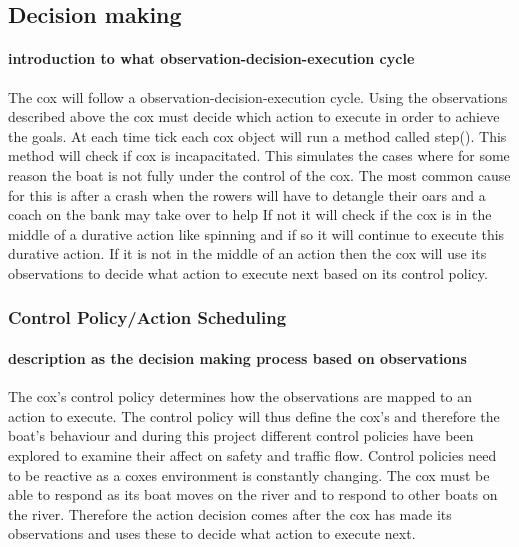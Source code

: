       \subsection{Decision making}
      \paragraph{introduction to what observation-decision-execution cycle}
      The cox will follow a observation-decision-execution cycle. Using the observations described above the cox must decide which action to execute in order to achieve the goals. At each time tick each cox object will run a method called step(). This method will check if cox is incapacitated. This simulates the cases where for some reason the boat is not fully under the control of the cox. The most common cause for this is after a crash when the rowers will have to detangle their oars and a coach on the bank may take over to help If not it will check if the cox is in the middle of a durative action like spinning and if so it will continue to execute this durative action. If it is not in the middle of an action then the cox will use its observations to decide what action to execute next based on its control policy.
      
      \subsubsection{Control Policy/Action Scheduling}
      \paragraph{description as the decision making process based on observations}
      The cox's control policy determines how the observations are mapped to an action to execute. The control policy will thus define the cox's and therefore the boat's behaviour and during this project different control policies have been explored to examine their affect on safety and traffic flow. Control policies need to be reactive as a coxes environment is constantly changing. The cox must be able to respond as its boat moves on the river and to respond to other boats on the river. Therefore the action decision comes after the cox has made its observations and uses these to decide what action to execute next.
      
